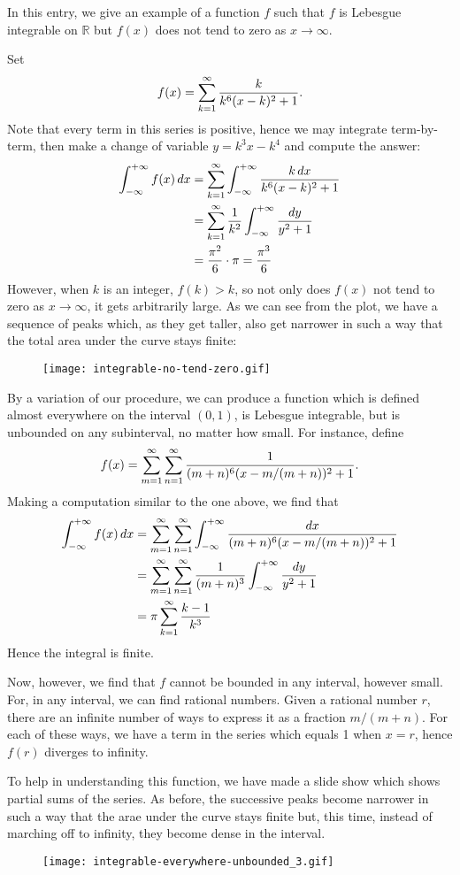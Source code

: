 \documentclass[12pt]{article}
\begin{document}

In this entry, we give an example of a function $f$ such that $f$ is Lebesgue 
integrable on $\mathbb{R}$ but $f(x)$ does not tend to zero as 
$x \rightarrow \infty$.

Set
\[
 f(x) = \sum_{k=1}^\infty {k \over k^6 (x-k)^2 + 1}.
\]
Note that every term in this series is positive, hence we may integrate
term-by-term, then make a change of variable $y = k^3 x - k^4$ and
compute the answer:
\begin{align*}
 \int_{-\infty}^{+\infty} f(x) \, dx &=
 \sum_{k=1}^\infty
 \int_{-\infty}^{+\infty}
 {k \, dx \over k^6 (x-k)^2 + 1} \\ &=
 \sum_{k=1}^\infty
 {1 \over k^2} 
 \int_{-\infty}^{+\infty}
 {dy \over y^2 + 1} \\ &=
 {\pi^2 \over 6} \cdot \pi = {\pi^3 \over 6}
\end{align*}
However, when $k$ is an integer, $f(k) > k$, so not only does $f(x)$ not 
tend to zero as $x \rightarrow \infty$, it gets arbitrarily large.
As we can see from the plot, we have a sequence of peaks which, as they get
taller, also get narrower in such a way that the total area under
the curve stays finite:
\begin{figure}
 \texttt{[image: integrable-no-tend-zero.gif]}
\end{figure}

By a variation of our procedure, we can produce a function which is
defined almost everywhere on the interval $(0,1)$, is Lebesgue integrable,
but is unbounded on any subinterval, no matter how small.  For instance,
define 
\[
 f(x) = \sum_{m=1}^\infty \sum_{n=1}^\infty 
 {1\over (m + n)^6 (x-m/(m+n))^2 + 1}.
\]
Making a computation similar to the one above, we find that 
\begin{align*}
 \int_{-\infty}^{+\infty} f(x) \, dx &=
 \sum_{m=1}^\infty
 \sum_{n=1}^\infty
  \int_{-\infty}^{+\infty}
   {dx \over (m+n)^6 (x-m/(m+n))^2 + 1} \\ &=
 \sum_{m=1}^\infty
 \sum_{n=1}^\infty
  {1 \over (m+n)^3} 
  \int_{-\infty}^{+\infty}
   {dy \over y^2 + 1} \\ &=
 \pi \sum_{k=1}^\infty
 {k-1 \over k^3}
\end{align*}
Hence the integral is finite.

Now, however, we find that $f$ cannot be bounded in any interval,
however small.  For, in any interval, we can find rational
numbers.  Given a rational number $r$, there are an infinite
number of ways to express it as a fraction $m/(m+n)$.  For
each of these ways, we have a term in the series which equals 1 
when $x=r$, hence $f(r)$ diverges to infinity.

To help in understanding this function, we have made a slide show
which shows partial sums of the series.  As before, the successive
peaks become narrower in such a way that the arae under the curve 
stays finite but, this time, instead of marching off to infinity,
they become dense in the interval.

\begin{figure}
 \texttt{[image: integrable-everywhere-unbounded\_3.gif]}
\end{figure}
\end{document}
